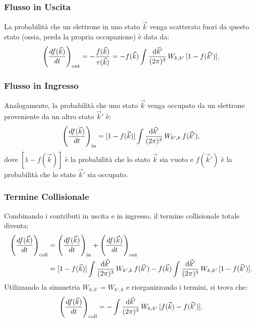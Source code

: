 \subsubsection*{Flusso in Uscita}
La probabilità che un elettrone in uno stato \(\vec{k}\) venga scatterato fuori da questo stato (ossia, perda la propria occupazione) è data da:
\[
\left(\frac{df(\vec{k})}{dt}\right)_{\text{out}} = -\frac{f(\vec{k})}{\tau(\vec{k})} = - f(\vec{k}) \int \frac{\text{d}\vec{k}'}{(2\pi)^3}\, W_{k,k'}\,[1-f(\vec{k}')].
\]

\subsubsection*{Flusso in Ingresso}
Analogamente, la probabilità che uno stato \(\vec{k}\) venga occupato da un elettrone proveniente da un altro stato \(\vec{k}'\) è:
\[
\left(\frac{df(\vec{k})}{dt}\right)_{\text{in}} = [1-f(\vec{k})] \int \frac{\text{d}\vec{k}'}{(2\pi)^3}\, W_{k',k}\, f(\vec{k}'),
\]
dove \([1-f(\vec{k})]\) è la probabilità che lo stato \(\vec{k}\) sia vuoto e \(f(\vec{k}')\) è la probabilità che lo stato \(\vec{k}'\) sia occupato.

\subsubsection*{Termine Collisionale}
Combinando i contributi in uscita e in ingresso, il termine collisionale totale diventa:
\begin{equation}\label{eqn:coll}
\begin{split}
\left(\frac{df(\vec{k})}{dt}\right)_{\text{coll}} &= \left(\frac{df(\vec{k})}{dt}\right)_{\text{in}} + \left(\frac{df(\vec{k})}{dt}\right)_{\text{out}} \\
&= [1-f(\vec{k})] \int \frac{\text{d}\vec{k}'}{(2\pi)^3}\, W_{k',k}\, f(\vec{k}') - f(\vec{k}) \int \frac{\text{d}\vec{k}'}{(2\pi)^3}\, W_{k,k'}\,[1-f(\vec{k}')].
\end{split}
\end{equation}
Utilizzando la simmetria \(W_{k,k'} = W_{k',k}\) e riorganizzando i termini, si trova che:
\[
\left(\frac{df(\vec{k})}{dt}\right)_{\text{coll}} = - \int \frac{\text{d}\vec{k}'}{(2\pi)^3}\, W_{k,k'}\,[f(\vec{k}) - f(\vec{k}')].
\]

